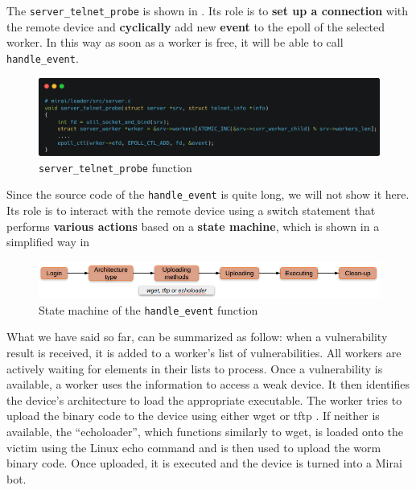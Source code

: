 The \texttt{server\_telnet\_probe} is shown in . Its role is to \textbf{set up a connection} with the remote device and \textbf{cyclically} add new \textbf{event} to the epoll of the selected worker. In this way as soon as a worker is free, it will be able to call \texttt{handle\_event}.

\begin{figure}[ht]
    \centering
    \includegraphics[scale=0.15]{resources/images/sever_telnet_probe.png}
    \caption{\texttt{server\_telnet\_probe} function}
    \label{fig:server-telnet-probe}
\end{figure}

Since the source code of the \texttt{handle\_event} is quite long, we will not show it here. Its role is to interact with the remote device using a switch statement that performs \textbf{various actions} based on a \textbf{state machine}, which is shown in a simplified way in 

\begin{figure}[ht]
    \centering
    \includegraphics[scale=0.5]{resources/images/state-machine.png}
    \caption{State machine of the \texttt{handle\_event} function}
    \label{fig:state-machine}
\end{figure}

What we have said so far, can be summarized as follow: when a vulnerability result is received, it is added to a worker's list of vulnerabilities. All workers are actively waiting for elements in their lists to process. Once a vulnerability is available, a worker uses the information to access a weak device. It then identifies the device's architecture to load the appropriate executable. The worker tries to upload the binary code to the device using either wget or tftp . If neither is available, the ``echoloader'', which functions similarly to wget, is loaded onto the victim using the Linux echo command and is then used to upload the worm binary code. Once uploaded, it is executed and the device is turned into a Mirai bot.\cite{de2018ddos}